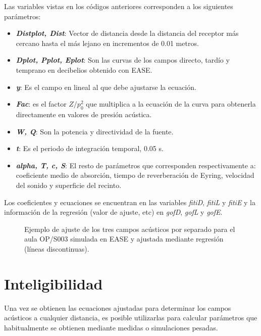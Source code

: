 Las variables vistas en los códigos anteriores corresponden a los siguientes parámetros:
\begin{itemize}
\itemsep0em
  \item \textbf{\textit{Distplot, Dist}}: Vector de distancia desde la distancia del receptor más cercano hasta el más lejano en incrementos de 0.01 metros.
  \item \textbf{\textit{Dplot, Pplot, Eplot}}: Son las curvas de los campos directo, tardío y temprano en decibelios obtenido con EASE.
  \item \textbf{\textit{y}}: Es el campo en lineal al que debe ajustarse la ecuación.
  \item \textbf{\textit{Fac}}: es el factor $Z/p_0^2$ que multiplica a la ecuación de la curva para obtenerla directamente en valores de presión acústica.
  \item \textbf{\textit{W, Q}}: Son la potencia y directividad de la fuente.
  \item \textbf{\textit{t}}: Es el periodo de integración temporal, 0.05 s.
  \item \textbf{\textit{alpha, T, c, S}}: El resto de parámetros que corresponden respectivamente a: coeficiente medio de absorción, tiempo de reverberación de Eyring, velocidad del sonido y superficie del recinto.
\end{itemize}


Los coeficientes y ecuaciones se encuentran en las variables \textit{fitiD}, \textit{fitiL} y \textit{fitiE} y la información de la regresión (valor de ajuste, etc) en \textit{gofD}, \textit{gofL} y \textit{gofE}.




\begin{figure}[ht]
    \centering%
    {%
    }
    \caption{Ejemplo de ajuste de los tres campos acústicos por separado para el aula OP/S003 simulada en EASE y ajustada mediante regresión (líneas discontinuas).}%
    \label{graf:trescamposajuste}%
\end{figure}
\FloatBarrier


\section{Inteligibilidad}
\label{desarrollointeligibilidad}
Una vez se obtienen las ecuaciones ajustadas para determinar los campos acústicos a cualquier distancia, es posible utilizarlas para calcular parámetros que habitualmente se obtienen mediante medidas o simulaciones pesadas.

